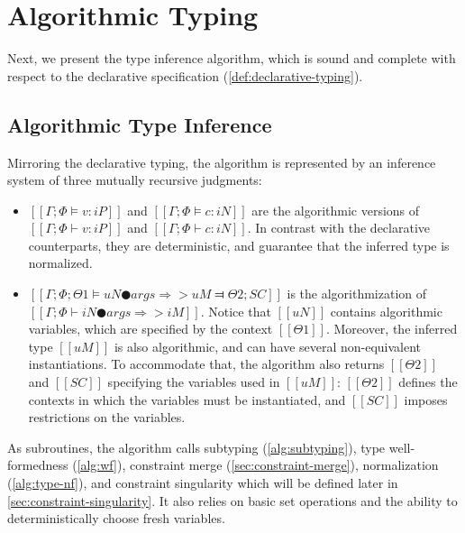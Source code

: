 \documentclass[acmsmall,natbib=false,review,anonymous]{acmart}
\begin{document}
\section{Algorithmic Typing}

Next, we present the type inference algorithm, 
which is sound and complete with respect to the declarative specification
(\cref{def:declarative-typing}).

\subsection{Algorithmic Type Inference}

Mirroring the declarative typing, 
the algorithm is represented by an inference system of three mutually recursive
judgments:
\begin{itemize}
  \item $[[Γ ; Φ ⊨ v : iP]]$ and  $[[Γ ; Φ ⊨ c : iN]]$
    are the algorithmic versions of $[[Γ ; Φ ⊢ v : iP]]$ and $[[Γ ; Φ ⊢ c : iN]]$.
    In contrast with the declarative counterparts, they are deterministic,
    and guarantee that the inferred type is normalized. 
  \item $[[Γ ; Φ ; Θ1 ⊨ uN ● args ⇒> uM ⫤ Θ2 ; SC]]$
    is the algorithmization of $[[Γ ; Φ ⊢ iN ● args ⇒> iM]]$.
    Notice that $[[uN]]$ contains algorithmic variables, 
    which are specified by the context $[[Θ1]]$.
    Moreover, the inferred type $[[uM]]$ is also algorithmic,
    and can have several non-equivalent instantiations. To accommodate that, 
    the algorithm also returns $[[Θ2]]$ and $[[SC]]$ specifying 
    the variables used in $[[uM]]$: $[[Θ2]]$ defines the contexts
    in which the variables must be instantiated, and $[[SC]]$
    imposes restrictions on the variables. 
\end{itemize}
As subroutines, the algorithm calls
subtyping (\cref{alg:subtyping}),
type well-formedness (\cref{alg:wf}),
constraint merge (\cref{sec:constraint-merge}),
normalization (\cref{alg:type-nf}),
and constraint singularity which will be defined later in 
\cref{sec:constraint-singularity}.
It also relies on basic set operations and the ability to 
deterministically choose fresh variables.

\begin{algorithm}
  \hfill \\
  \ottdefnATPInfLabeled{}
  \hfill \\
  \ottdefnATNInfLabeled{}
  \hfill \\
  \ottdefnATSpinInfLabeled{}
\end{algorithm}
\end{document}
